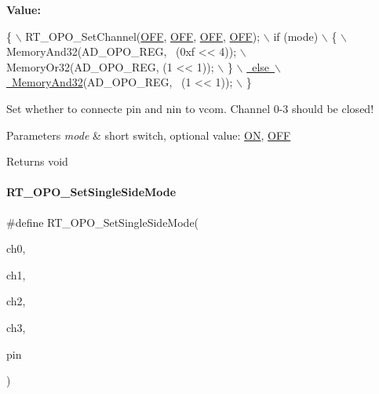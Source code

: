 {\bfseries Value\+:}
\begin{DoxyCode}
\{                                             \(\backslash\)
        RT\_OPO\_SetChannel(\mbox{\hyperlink{a00020_ab43e533f3793920486fb81c580f71564aac132f2982b98bcaa3445e535a03ff75}{OFF}}, \mbox{\hyperlink{a00020_ab43e533f3793920486fb81c580f71564aac132f2982b98bcaa3445e535a03ff75}{OFF}}, \mbox{\hyperlink{a00020_ab43e533f3793920486fb81c580f71564aac132f2982b98bcaa3445e535a03ff75}{OFF}}, \mbox{\hyperlink{a00020_ab43e533f3793920486fb81c580f71564aac132f2982b98bcaa3445e535a03ff75}{OFF}});    \(\backslash\)
        if (mode)                                 \(\backslash\)
        \{                                         \(\backslash\)
            MemoryAnd32(AD\_OPO\_REG, ~(0xf << 4)); \(\backslash\)
            MemoryOr32(AD\_OPO\_REG, (1 << 1));     \(\backslash\)
        \}                                         \mbox{\hyperlink{a00020_a5c1a2bd4c1bd4c2f429d8042a45327ff}{\(\backslash\)}}
\mbox{\hyperlink{a00020_a5c1a2bd4c1bd4c2f429d8042a45327ff}{        else                                      \(\backslash\)}}
\mbox{\hyperlink{a00020_a5c1a2bd4c1bd4c2f429d8042a45327ff}{            MemoryAnd32}}(AD\_OPO\_REG, ~(1 << 1));   \(\backslash\)
    \}
\end{DoxyCode}


Set whether to connecte pin and nin to vcom. Channel 0-\/3 should be closed! 


\begin{DoxyParams}{Parameters}
{\em mode} & short switch, optional value\+: \mbox{\hyperlink{a00020_ab43e533f3793920486fb81c580f71564a977d478dacaae531f95695750d1e9d03}{ON}}, \mbox{\hyperlink{a00020_ab43e533f3793920486fb81c580f71564aac132f2982b98bcaa3445e535a03ff75}{O\+FF}} \\
\hline
\end{DoxyParams}
\begin{DoxyReturn}{Returns}
void 
\end{DoxyReturn}
\mbox{\label{a00002_a6438defc0d6280f2b5baedc039f2e314}} 
\paragraph{\texorpdfstring{R\+T\+\_\+\+O\+P\+O\+\_\+\+Set\+Single\+Side\+Mode}{RT\_OPO\_SetSingleSideMode}}
{\footnotesize\ttfamily \#define R\+T\+\_\+\+O\+P\+O\+\_\+\+Set\+Single\+Side\+Mode(\begin{DoxyParamCaption}\item[{}]{ch0,  }\item[{}]{ch1,  }\item[{}]{ch2,  }\item[{}]{ch3,  }\item[{}]{pin }\end{DoxyParamCaption})}

